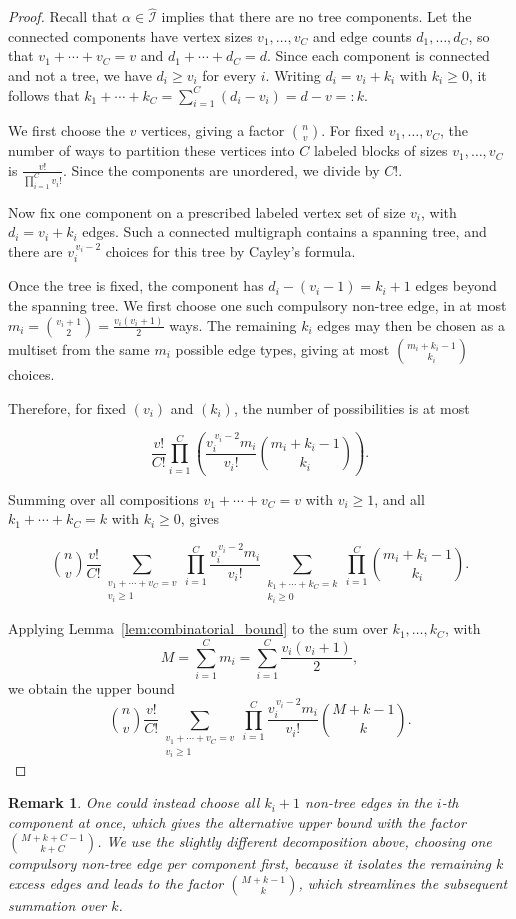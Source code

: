 \documentclass[11pt, letterpaper]{article}
\newtheorem{remark}[theorem]{Remark}
\numberwithin{equation}{section}
\newcommand{\goodI}{\widehat{\mathcal{I}}}
\begin{document}
\begin{proof}
Recall that $\alpha \in \goodI$ implies that there are no tree components. Let the connected components have vertex sizes $v_1,\dots,v_C$ and edge counts $d_1,\dots,d_C$, so that $v_1+\cdots+v_C=v$ and $d_1+\cdots+d_C=d$. Since each component is connected and not a tree, we have $d_i\ge v_i$ for every $i$. Writing $d_i=v_i+k_i$ with $k_i\ge 0$, it follows that $k_1+\cdots+k_C=\sum_{i=1}^C(d_i-v_i)=d-v=:k$.

We first choose the $v$ vertices, giving a factor $\binom{n}{v}$. For fixed $v_1,\dots,v_C$, the number of ways to partition these vertices into $C$ labeled blocks of sizes $v_1,\dots,v_C$ is $\frac{v!}{\prod_{i=1}^C v_i!}$. Since the components are unordered, we divide by $C!$.

Now fix one component on a prescribed labeled vertex set of size $v_i$, with $d_i=v_i+k_i$ edges. Such a connected multigraph contains a spanning tree, and there are $v_i^{\,v_i-2}$ choices for this tree by Cayley's formula. 


Once the tree is fixed, the component has $d_i-(v_i-1)=k_i+1$ edges beyond the spanning tree. We first choose one such compulsory non-tree edge, in at most $m_i=\binom{v_i+1}{2}=\frac{v_i(v_i+1)}{2}$ ways. The remaining $k_i$ edges may then be chosen as a multiset from the same $m_i$ possible edge types, giving at most $\binom{m_i+k_i-1}{k_i}$ choices.


Therefore, for fixed $(v_i)$ and $(k_i)$, the number of possibilities is at most

\[
\frac{v!}{C!} 
\prod_{i=1}^C
\left(
\frac{v_i^{\,v_i-2}m_i}{v_i!}\binom{m_i+k_i-1}{k_i}
\right).
\]

Summing over all compositions $v_1+\cdots+v_C=v$ with $v_i\ge 1$, and all $k_1+\cdots+k_C=k$ with $k_i\ge 0$, gives

\[
\binom{n}{v} \frac{v!}{C!} 
\sum_{\substack{v_1+\cdots+v_C=v \\ v_i \ge 1}}
\prod_{i=1}^C
\frac{v_i^{\,v_i-2}m_i}{v_i!}
\sum_{\substack{k_1+\cdots+k_C=k \\ k_i \ge 0}}
\prod_{i=1}^C
\binom{m_i+k_i-1}{k_i}.
\]

Applying Lemma~\ref{lem:combinatorial_bound} to the sum over $k_1,\dots,k_C$, with
\[
M=\sum_{i=1}^C m_i=\sum_{i=1}^C\frac{v_i(v_i+1)}2,
\]
we obtain the upper bound
\[
\binom{n}{v}\frac{v!}{C!}
\sum_{\substack{v_1+\cdots+v_C=v \\ v_i \ge 1}}
\prod_{i=1}^C
\frac{v_i^{\,v_i-2}m_i}{v_i!}
\binom{M+k-1}{k}.
\]
\end{proof}
\begin{remark}
One could instead choose all $k_i+1$ non-tree edges in the $i$-th component at once,
which gives the alternative upper bound with the factor $\binom{M+k+C-1}{k+C}$. We use the slightly different decomposition above, choosing one compulsory non-tree edge
per component first, because it isolates the remaining $k$ excess edges and leads to the
factor $\binom{M+k-1}{k}$,
which streamlines the subsequent summation over $k$.
\end{remark}
\end{document}
